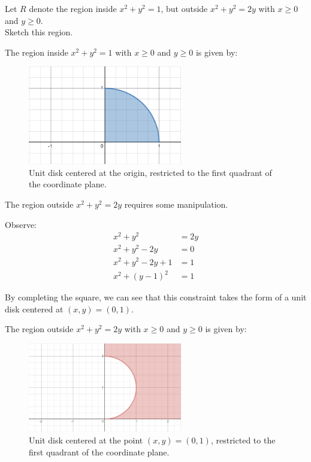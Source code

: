 \begin{tcolorbox}[
        title={Problem 36 (a)},
        valign=center,
        nobeforeafter,
        colframe=gray!95!black
    ]
    Let \(R\) denote the region inside \(x^2 + y^2 = 1\), but outside \(x^2 + y^2 = 2y\) with \(x \geq 0\) and \(y \geq 0\). \\
    
    Sketch this region.
\end{tcolorbox}

\begin{solution}
    The region inside \(x^2 + y^2 = 1\) with \(x \geq 0\) and \(y \geq 0\) is given by:
    \begin{figure}[h!]
        \centering
        \includegraphics[width=0.6\textwidth]{Pictures/Tutorial 6-1.png}
        \caption{Unit disk centered at the origin, restricted to the first quadrant of the coordinate plane.}
    \end{figure}
    
    The region outside \(x^2 + y^2 = 2y\) requires some manipulation. 
    
    Observe:
    \begin{align*}
        x^2 + y^2 &= 2y \\
        x^2 + y^2 - 2y &= 0 \\
        x^2 + y^2 - 2y + 1 &= 1 \\
        x^2 + (y - 1)^2 &= 1
    \end{align*}
    
    By completing the square, we can see that this constraint takes the form of a unit disk centered at \((x, y) = (0, 1)\). 
    
    The region outside \(x^2 + y^2 = 2y\) with \(x \geq 0\) and \(y \geq 0\) is given by:
    \begin{figure}[h!]
        \centering
        \includegraphics[width=0.6\textwidth]{Pictures/Tutorial 6-2.png}
        \caption{Unit disk centered at the point \((x, y) = (0, 1)\), restricted to the first quadrant of the coordinate plane.}
    \end{figure}
    

\end{solution}
